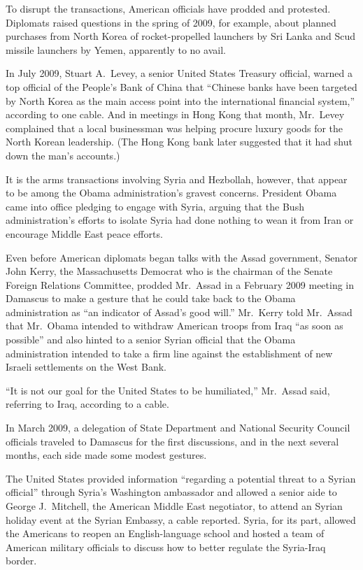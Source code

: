 ﻿\documentclass[12pt]{article}
\begin{document}
To disrupt the transactions, American officials have prodded and protested. Diplomats raised
questions in the spring of 2009, for example, about planned purchases from North Korea of
rocket-propelled launchers by Sri Lanka and Scud missile launchers by Yemen, apparently to no avail.

In July 2009, Stuart A.~Levey, a senior United States Treasury official, warned a top official of
the People's Bank of China that ``Chinese banks have been targeted by North Korea as the main access
point into the international financial system,'' according to one cable. And in meetings in Hong
Kong that month, Mr.~Levey complained that a local businessman was helping procure luxury goods for
the North Korean leadership. (The Hong Kong bank later suggested that it had shut down the man's
accounts.)

It is the arms transactions involving Syria and Hezbollah, however, that appear to be among the
Obama administration's gravest concerns. President Obama came into office pledging to engage with
Syria, arguing that the Bush administration's efforts to isolate Syria had done nothing to wean it
from Iran or encourage Middle East peace efforts.

Even before American diplomats began talks with the Assad government, Senator John Kerry, the
Massachusetts Democrat who is the chairman of the Senate Foreign Relations Committee, prodded
Mr.~Assad in a February 2009 meeting in Damascus to make a gesture that he could take back to the
Obama administration as ``an indicator of Assad's good will.'' Mr.~Kerry told Mr.~Assad that
Mr.~Obama intended to withdraw American troops from Iraq ``as soon as possible'' and also hinted to
a senior Syrian official that the Obama administration intended to take a firm line against the
establishment of new Israeli settlements on the West Bank.

``It is not our goal for the United States to be humiliated,'' Mr.~Assad said, referring to Iraq,
according to a cable.

In March 2009, a delegation of State Department and National Security Council officials traveled to
Damascus for the first discussions, and in the next several months, each side made some modest
gestures.

The United States provided information ``regarding a potential threat to a Syrian official'' through
Syria's Washington ambassador and allowed a senior aide to George J.~Mitchell, the American Middle
East negotiator, to attend an Syrian holiday event at the Syrian Embassy, a cable reported. Syria,
for its part, allowed the Americans to reopen an English-language school and hosted a team of
American military officials to discuss how to better regulate the Syria-Iraq border.
\end{document}
